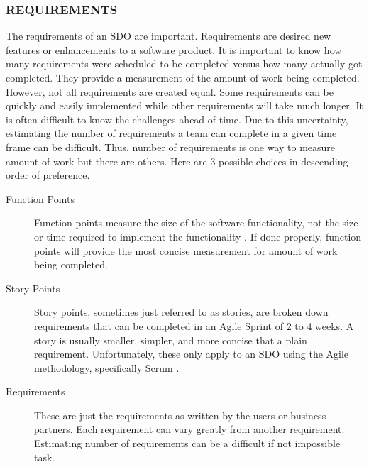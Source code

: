 \documentclass[SDSUThesis.tex]{subfiles}
\begin{document}
        \subsubsection{REQUIREMENTS}
            The requirements of an SDO are important. Requirements are desired 
            new features or enhancements to a software product.  It is important
            to know how many requirements
            were scheduled to be completed versus how many actually got completed. 
            They provide a measurement
            of the amount of work being completed. However, not all requirements
            are created equal.  Some requirements can be quickly and easily
            implemented while other requirements will take much longer.  It
            is often difficult to know the challenges ahead of time.  Due to
            this uncertainty, estimating
            the number of requirements a team can complete in a given time frame can
            be difficult. Thus, number of requirements is one way to measure 
            amount of work
            but there are others.  Here are 3 possible choices in descending
            order of preference.
            \begin{description}
                \item[Function Points] Function points measure the size of the
                    software functionality, not the size or time required
                    to implement the functionality \cite{Jensen2014}.  
                    If done properly,
                    function points will provide the most concise measurement
                    for amount of work being completed. 
                \item[Story Points] Story points, sometimes just referred to 
                    as stories, are broken down requirements that can be
                    completed in an Agile Sprint of 2 to 4 weeks.  A 
                    story is usually smaller, simpler, and more concise
                    that a plain requirement. 
                    Unfortunately, these only apply to an
                    SDO using the Agile methodology, specifically 
                    Scrum \cite{Ashmore2014}.
                \item[Requirements] These are just the requirements as
                    written by the users or business partners.  Each requirement
                    can vary greatly from another requirement.  Estimating
                    number of requirements can be a difficult if not impossible
                    task.  
            \end{description}
            
\end{document}
